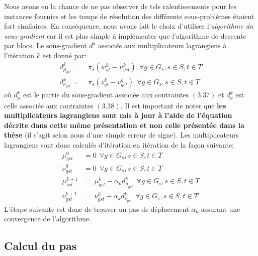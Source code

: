 Nous avons eu la chance de ne pas observer de tels ralentissements pour les instances fournies et les temps de résolution des différents
sous-problèmes étaient fort similaires. En conséquence, nous avons fait le choix d'utiliser l'\textit{algorithme du sous-gradient} car il est
plus simple à implémenter que l'algorithme de descente par blocs.
Le sous-gradient $d^k$ associés aux multiplicateurs lagrangiens à l'itération $k$ est donné par:
\begin{align}
    d_{\mu_{gst}}^k = & \ \pi_s (w_{gt}^k - u_{gst}^k) \ \  \forall g \in G_s, s \in S, t \in T \\
    d_{\nu_{gst}}^k = & \ \pi_s (z_{gt}^k - v_{gst}^k) \ \  \forall g \in G_s, s \in S, t \in T
\end{align}
où $d_{\mu}^k$ est le partie du sous-gradient associée aux contraintes $(3.37)$ et $d_{\nu}^k$ est celle associée aux contraintes $(3.38)$.
Il est important de noter que \textbf{les multiplicateurs lagrangiens sont mis à jour à l'aide de l'équation décrite dans cette même présentation
et non celle présentée dans la thèse} \citep{Papavasiliou12couplingrenewable} (il s'agit selon nous d'une simple erreur de signe).
Les multiplicateurs lagrangiens sont donc calculés d'itération en itération de la façon suivante:
\begin{align}
    \mu_{gst}^{0} & = 0 \ \  \forall g \in G_s, s \in S, t \in T \\
    \nu_{gst}^{0} & = 0 \ \  \forall g \in G_s, s \in S, t \in T \\
    \mu_{gst}^{k+1} & = \ \mu_{gst}^{k} - \alpha_k d_{\mu_{gst}}^k \ \  \forall g \in G_s, s \in S, t \in T \\
    \nu_{gst}^{k+1} & = \ \nu_{gst}^{k} - \alpha_k d_{\nu_{gst}}^k \ \  \forall g \in G_s, s \in S, t \in T
\end{align}
L'étape suivante est donc de trouver un pas de déplacement $\alpha_k$ assurant une convergence de l'algorithme.

\subsection{Calcul du pas}

